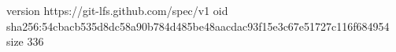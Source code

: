 version https://git-lfs.github.com/spec/v1
oid sha256:54cbacb535d8dc58a90b784d485be48aacdac93f15e3c67e51727c116f684954
size 336
